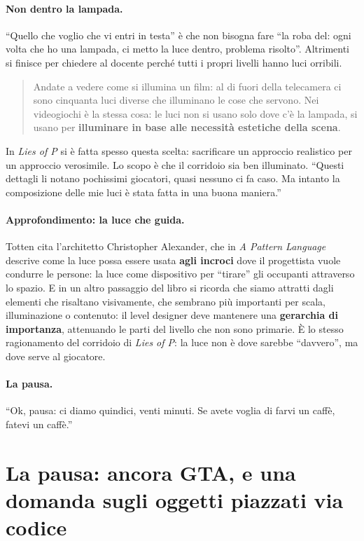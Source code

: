\paragraph{Non dentro la lampada.} ``Quello che voglio che vi entri in testa'' è che
non bisogna fare ``la roba del: ogni volta che ho una lampada, ci metto la luce
dentro, problema risolto''. Altrimenti si finisce per chiedere al docente perché
tutti i propri livelli hanno luci orribili.
\begin{quote}
Andate a vedere come si illumina un film: al di fuori della telecamera ci sono
cinquanta luci diverse che illuminano le cose che servono. Nei videogiochi è la
stessa cosa: le luci non si usano solo dove c'è la lampada, si usano per
\textbf{illuminare in base alle necessità estetiche della scena}.
\end{quote}
In \emph{Lies of P} si è fatta spesso questa scelta: sacrificare un approccio
realistico per un approccio verosimile. Lo scopo è che il corridoio sia ben
illuminato. ``Questi dettagli li notano pochissimi giocatori, quasi nessuno ci fa
caso. Ma intanto la composizione delle mie luci è stata fatta in una buona
maniera.''

\paragraph{Approfondimento: la luce che guida.} Totten cita l'architetto
Christopher Alexander, che in \emph{A Pattern Language} descrive come la luce possa
essere usata \textbf{agli incroci} dove il progettista vuole condurre le persone:
la luce come dispositivo per ``tirare'' gli occupanti attraverso lo spazio. E in un
altro passaggio del libro si ricorda che siamo attratti dagli elementi che
risaltano visivamente, che sembrano più importanti per scala, illuminazione o
contenuto: il level designer deve mantenere una \textbf{gerarchia di importanza},
attenuando le parti del livello che non sono primarie. È lo stesso ragionamento del
corridoio di \emph{Lies of P}: la luce non è dove sarebbe ``davvero'', ma dove serve
al giocatore.

\paragraph{La pausa.} ``Ok, pausa: ci diamo quindici, venti minuti. Se avete voglia di
farvi un caffè, fatevi un caffè.''

\section{La pausa: ancora GTA, e una domanda sugli oggetti piazzati via codice}
\label{gd14:sec:pausa}

